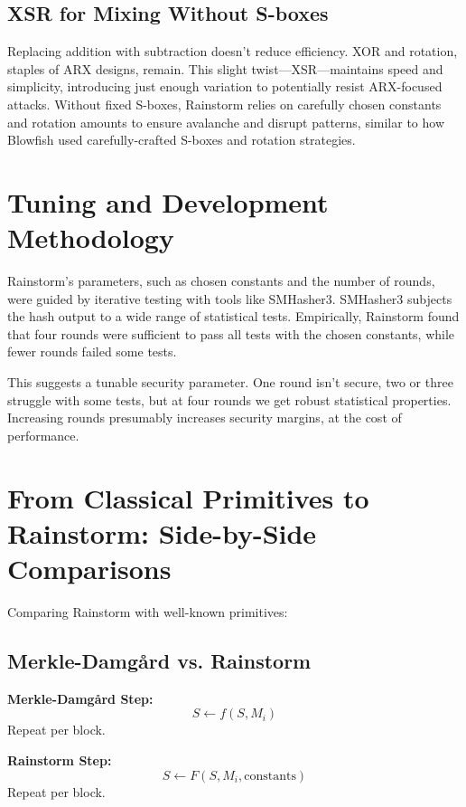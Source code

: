 \documentclass[11pt,a4paper]{article}
\begin{document}
\subsection*{XSR for Mixing Without S-boxes}
Replacing addition with subtraction doesn’t reduce efficiency. XOR and rotation, staples of ARX designs, remain. This slight twist—XSR—maintains speed and simplicity, introducing just enough variation to potentially resist ARX-focused attacks. Without fixed S-boxes, Rainstorm relies on carefully chosen constants and rotation amounts to ensure avalanche and disrupt patterns, similar to how Blowfish used carefully-crafted S-boxes and rotation strategies.

\section*{Tuning and Development Methodology}
Rainstorm’s parameters, such as chosen constants and the number of rounds, were guided by iterative testing with tools like SMHasher3. SMHasher3 subjects the hash output to a wide range of statistical tests. Empirically, Rainstorm found that four rounds were sufficient to pass all tests with the chosen constants, while fewer rounds failed some tests.

This suggests a tunable security parameter. One round isn’t secure, two or three struggle with some tests, but at four rounds we get robust statistical properties. Increasing rounds presumably increases security margins, at the cost of performance.

\section*{From Classical Primitives to Rainstorm: Side-by-Side Comparisons}
Comparing Rainstorm with well-known primitives:

\subsection*{Merkle-Damg{\aa}rd vs. Rainstorm}
\noindent\begin{minipage}[t]{0.45\textwidth}
\textbf{Merkle-Damg{\aa}rd Step:}
\[
S \gets f(S, M_i)
\]
Repeat per block.
\end{minipage}
\hfill
\begin{minipage}[t]{0.45\textwidth}
\textbf{Rainstorm Step:}
\[
S \gets F(S, M_i, \text{constants})
\]
Repeat per block.
\end{minipage}
\end{document}
